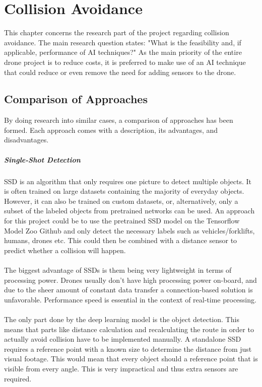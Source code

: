 \chapter{Collision Avoidance}
\label{ch:collision_avoidance}
This chapter concerns the research part of the project regarding collision avoidance. The main research question states: "What is the feasibility and, if applicable, performance of \gls{AI} techniques?" As the main priority of the entire drone project is to reduce costs, it is preferred to make use of an \gls{AI} technique that could reduce or even remove the need for adding sensors to the drone. 

\section{Comparison of Approaches}
By doing research into similar cases, a comparison of approaches has been formed. Each approach comes with a description, its advantages, and disadvantages.

\paragraph{Single-Shot Detection}
\gls{SSD} is an algorithm that only requires one picture to detect multiple objects. It is often trained on large datasets containing the majority of everyday objects. However, it can also be trained on custom datasets, or, alternatively, only a subset of the labeled objects from pretrained networks can be used. An approach for this project could be to use the pretrained \gls{SSD} model on the Tensorflow Model Zoo Github and only detect the necessary labels such as vehicles/forklifts, humans, drones etc. This could then be combined with a distance sensor to predict whether a collision will happen.
\\\\
The biggest advantage of \gls{SSD}s is them being very lightweight in terms of processing power. Drones usually don't have high processing power on-board, and due to the sheer amount of constant data transfer a connection-based solution is unfavorable. Performance speed is essential in the context of real-time processing.
\\\\
The only part done by the deep learning model is the object detection. This means that parts like distance calculation and recalculating the route in order to actually avoid collision have to be implemented manually. A standalone \gls{SSD} requires a reference point with a known size to determine the distance from just visual footage. This would mean that every object should a reference point that is visible from every angle. This is very impractical and thus extra sensors are required.
\pagebreak
